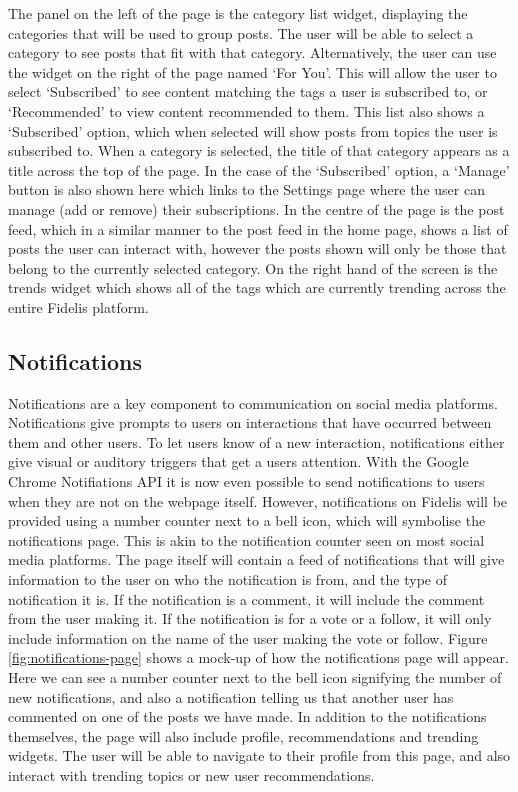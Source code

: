 The panel on the left of the page is the category list widget, displaying the categories that will be used to group posts. The user will be able to select a category to see posts that fit with that category. Alternatively, the user can use the widget on the right of the page named `For You'. This will allow the user to select `Subscribed' to see content matching the tags a user is subscribed to, or `Recommended' to view content recommended to them. This list also shows a `Subscribed' option, which when selected will show posts from topics the user is subscribed to. When a category is selected, the title of that category appears as a title across the top of the page. In the case of the `Subscribed' option, a `Manage' button is also shown here which links to the Settings page where the user can manage (add or remove) their subscriptions. In the centre of the page is the post feed, which in a similar manner to the post feed in the home page, shows a list of posts the user can interact with, however the posts shown will only be those that belong to the currently selected category. On the right hand of the screen is the trends widget which shows all of the tags which are currently trending across the entire Fidelis platform.

\subsection{Notifications}
Notifications are a key component to communication on social media platforms. Notifications give prompts to users on interactions that have occurred between them and other users. To let users know of a new interaction, notifications either give visual or auditory triggers that get a users attention. With the Google Chrome Notifiations API \cite{ChromeAPI:Notifications} it is now even possible to send notifications to users when they are not on the webpage itself. However, notifications on Fidelis will be provided using a number counter next to a bell icon, which will symbolise the notifications page. This is akin to the notification counter seen on most social media platforms. The page itself will contain a feed of notifications that will give information to the user on who the notification is from, and the type of notification it is. If the notification is a comment, it will include the comment from the user making it. If the notification is for a vote or a follow, it will only include information on the name of the user making the vote or follow. Figure \ref{fig:notifications-page} shows a mock-up of how the notifications page will appear. Here we can see a number counter next to the bell icon signifying the number of new notifications, and also a notification telling us that another user has commented on one of the posts we have made. In addition to the notifications themselves, the page will also include profile, recommendations and trending widgets. The user will be able to navigate to their profile from this page, and also interact with trending topics or new user recommendations.

